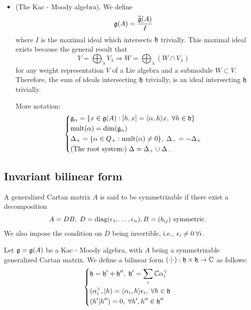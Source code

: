 \begin{itemize}
\begin{equation}
\begin{aligned}
        \end{aligned}\right.
    \end{equation}
    \item(The Kac - Moody algebra). We define 
    \begin{equation}
        \mathfrak{g}(A) = \frac{\widetilde{\mathfrak{g}}(A)}{ I }
    \end{equation}
    where $I$ is the maximal ideal which intersects $\mathfrak{h}$ trivially. This maximal ideal exists because the general result that 
    \begin{equation}
        V = \bigoplus_\lambda V_\lambda \Rightarrow W = \bigoplus_\lambda (W\cap V_\lambda)
    \end{equation}
    for any weight representation $V$ of a Lie algebra and a submodule $W\subset V$. Therefore, the sum of ideals 
    intersecting $\mathfrak{h}$ trivially, is an ideal intersecting $\mathfrak{h}$ trivially.

    More notation:
    \begin{equation}
        \left\{\begin{aligned}
            &\mathfrak{g}_\alpha = \{x\in\mathfrak{g}(A):[h,x]=\langle\alpha,h\rangle x,\;\forall h\in\mathfrak{h}\}\\
            &\text{mult}(\alpha) = \dim(\mathfrak{g}_\alpha)\\
            &\Delta_+ = \{\alpha\in Q_+: \text{mult}(\alpha) \neq 0\},\;\Delta_-=-\Delta_+\\
            &(\text{The root system:})\;\Delta = \Delta_+ \cup \Delta_-
        \end{aligned}\right.
    \end{equation}
\end{itemize}

\subsection{Invariant bilinear form}

A generalized Cartan matrix $A$ is said to be symmetrizable if there exist a decomposition
\begin{equation}
    A = DB,\; D = \text{diag}(\epsilon_1,\dots,\epsilon_n), B=(b_{ij}) \text{ symmetric}.
\end{equation}
We also impose the condition on $D$ being invertible, i.e., $\epsilon_i\neq0\;\forall i$.\par 

Let $\mathfrak{g} = \mathfrak{g}(A)$ be a Kac - Moody algebra, with $A$ being a symmetrizable generalized Cartan matrix. We define 
a bilinear form $(\cdot|\cdot):\mathfrak{h}\times\mathfrak{h}\to\mathbb{C}$ as follows:
\begin{equation}\label{equation : invairant bilinear form relations}
    \left\{\begin{aligned}
        &\mathfrak{h} = \mathfrak{h}^\prime + \mathfrak{h}^{\prime\prime},\;\mathfrak{h}^{\prime} = \sum_i\mathbb{C}\alpha^{\vee}_i\\
        &(\alpha^{\vee}_i,|h)=\langle\alpha_i,h\rangle\epsilon_i,\;\forall h\in\mathfrak{h}\\
        &(h^{\prime}|h^{\prime\prime}) = 0 ,\;\forall h^{\prime},h^{\prime\prime}\in\mathfrak{h}^{\prime\prime}
    \end{aligned}\right.
\end{equation} 

